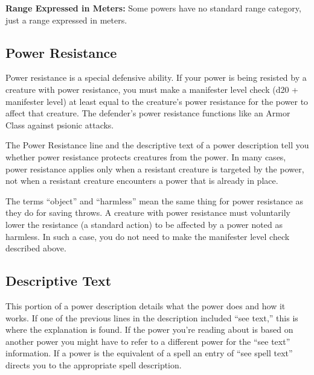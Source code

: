 


\textbf{Range Expressed in Meters:} Some powers have no standard range category, just a range expressed in meters.





\subsection{Power Resistance}
Power resistance is a special defensive ability. If your power is being resisted by a creature with power resistance, you must make a manifester level check (d20 + manifester level) at least equal to the creature's power resistance for the power to affect that creature. The defender's power resistance functions like an Armor Class against psionic attacks. %

The Power Resistance line and the descriptive text of a power description tell you whether power resistance protects creatures from the power. In many cases, power resistance applies only when a resistant creature is targeted by the power, not when a resistant creature encounters a power that is already in place.

The terms ``object'' and ``harmless'' mean the same thing for power resistance as they do for saving throws. A creature with power resistance must voluntarily lower the resistance (a standard action) to be affected by a power noted as harmless. In such a case, you do not need to make the manifester level check described above.



\subsection{Descriptive Text}
This portion of a power description details what the power does and how it works. If one of the previous lines in the description included ``see text,'' this is where the explanation is found. If the power you're reading about is based on another power you might have to refer to a different power for the ``see text'' information. If a power is the equivalent of a spell an entry of ``see spell text'' directs you to the appropriate spell description.

